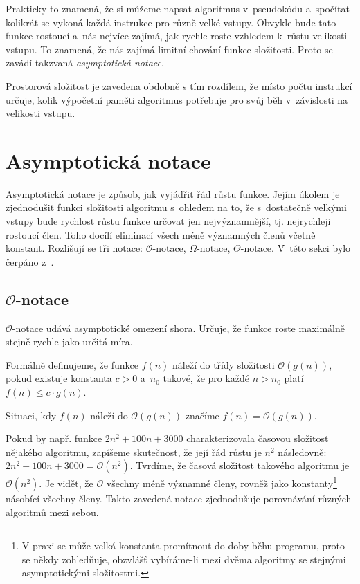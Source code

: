 \documentclass[12pt]{report}			%
\begin{document}
			
			Prakticky to znamená, že si můžeme napsat algoritmus v~pseudokódu a~spočítat kolikrát se vykoná každá instrukce pro různě velké vstupy. Obvykle bude tato funkce rostoucí a~nás nejvíce zajímá, jak rychle roste vzhledem k~růstu velikosti vstupu. To znamená, že nás zajímá limitní chování funkce složitosti. Proto se zavádí takzvaná \emph{asymptotická notace}.
			
			Prostorová složitost je zavedena obdobně s tím rozdílem, že místo počtu instrukcí určuje, kolik výpočetní paměti algoritmus potřebuje pro svůj běh v~závislosti na velikosti vstupu. \cite{pruvodce}
			\section{Asymptotická notace}
			Asymptotická notace je způsob, jak vyjádřit řád růstu funkce. Jejím úkolem je zjednodušit funkci složitosti algoritmu s~ohledem na to, že s~dostatečně velkými vstupy bude rychlost růstu funkce určovat jen nejvýznamnější, tj. nejrychleji rostoucí člen. Toho docílí eliminací všech méně významných členů včetně konstant. Rozlišují se tři notace: $\mathcal{O}$-notace, $\Omega$-notace, $\Theta$-notace. V~této sekci bylo čerpáno z~\cite{intro}.
			
			\subsection{$\mathcal{O}$-notace}
			
			$\mathcal{O}$-notace udává asymptotické omezení shora. Určuje, že funkce roste maximálně stejně rychle jako určitá míra.
			
			Formálně definujeme, že funkce $f(n)$ náleží do třídy složitosti $\mathcal{O}(g(n))$, pokud existuje konstanta $c > 0$ a~$n_0$ takové, že pro každé $n>n_0$ platí $f(n) \leq c \cdot g(n)$.
			
			Situaci, kdy $f(n)$ náleží do $\mathcal{O}(g(n))$ značíme $f(n) = \mathcal{O}(g(n))$.
			
			Pokud by např. funkce $2n^2+100n+3000$ charakterizovala časovou složitost nějakého algoritmu, zapíšeme skutečnost, že její řád růstu je $n^2$ následovně: $2n^2+100n+3000 = \mathcal{O}(n^2)$. Tvrdíme, že časová složitost takového algoritmu je $\mathcal{O}(n^2)$. Je vidět, že $\mathcal{O}$  všechny méně významné členy, rovněž jako konstanty\footnote{V praxi se může velká konstanta promítnout do doby běhu programu, proto se někdy zohledňuje, obzvlášť vybíráme-li mezi dvěma algoritmy se stejnými asymptotickými složitostmi.} násobící všechny členy. Takto zavedená notace zjednodušuje porovnávání různých algoritmů mezi sebou.
			
\end{document}
